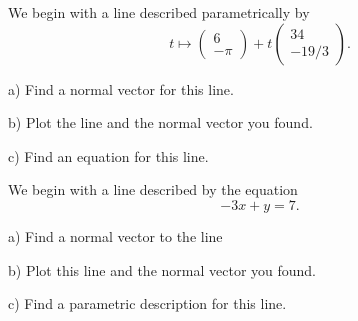 \documentclass[elementsmain.tex]{subfiles}
\begin{document}
\begin{exercise}\label{task:norm-to-param}
We begin with a line described parametrically by
\[
t \mapsto \begin{pmatrix} 6\\ -\pi \end{pmatrix} + t \begin{pmatrix} 34 \\ -19/3\end{pmatrix}.
\]
\begin{compactitem}
\item[a)] Find a normal vector for this line.
\item[b)] Plot the line and the normal vector you found.
\item[c)] Find an equation for this line.
\end{compactitem}
\end{exercise}


\begin{exercise}\label{task:norm-to-eqn}
We begin with a line described by the equation
\[
-3x + y =7.
\]
\begin{compactitem}
\item[a)] Find a normal vector to the line
\item[b)] Plot this line and the normal vector you found.
\item[c)] Find a parametric description for this line.
\end{compactitem}
\end{exercise}






\clearpage
\end{document}
